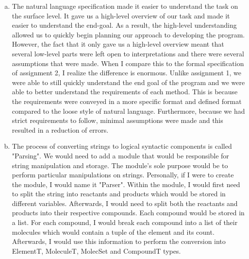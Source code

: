 \documentclass[12pt]{article}
\begin{document}
\begin{enumerate}[a)]

\item The natural language specification made it easier to understand the task on the surface level. It gave us a high-level overview of our task and made it easier
to understand the end-goal. As a result, the high-level understanding allowed us to quickly begin planning our approach to developing the program. However, the fact 
that it only gave us a high-level overview meant that several low-level parts were left open to interpretations and there were several assumptions that were made. 
When I compare this to the formal specification of assignment 2, I realize the difference is enormous. Unlike assignment 1, we were able to still quickly understand the
end goal of the program and we were able to better understand the requirements of each method. This is because the requirements were conveyed in a more specific format and
defined format compared to the loose style of natural language. Furthermore, because we had strict requirements to follow, minimal assumptions were made and this resulted
in a reduction of errors. 

\item The process of converting strings to logical syntactic components is called "Parsing". We would need to add a module that would be responsible for string manipulation
and storage. The module's sole purpose would be to perform particular manipulations on strings. Personally, if I were to create the module, I would name it "Parser".
Within the module, I would first need to split the string into reactants and products which would be stored in different variables. Afterwards, I would need to split both the reactants and products into their respective
compounds. Each compound would be stored in a list. For each compound, I would break each compound into a list of their molecules which would contain a tuple of the element and its count. 
Afterwards, I would use this information to perform the conversion into ElementT, MoleculeT, MolecSet and CompoundT types.


\end{enumerate}
\end{document}
